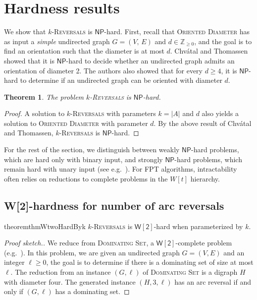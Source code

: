 \documentclass[11pt, twoside]{article}
\numberwithin{equation}{section}
\numberwithin{table}{section}
\numberwithin{figure}{section}
\newtheorem{theorem}{Theorem}[section]
\theoremstyle{definition}
\theoremstyle{definition}
\theoremstyle{definition}
\def\NP{\mathsf{NP}}
\def\W2{\mathsf{W[2]}}
\begin{document}
\section{Hardness results} \label{sec:hardness}
We show that  \textsc{$k$-Reversals} is $\NP$-hard. First, recall that \textsc{Oriented Diameter} has as input a \emph{simple} undirected graph $G=(V, \, E)$ and $d \in \mathbb{Z}_{\geq 0}$, and the goal is  to find an orientation such that the diameter is at most $d$. Chv{\'a}tal and Thomassen \cite{chvatal1978distances} showed that it is  $\NP$-hard to decide whether an undirected graph admits an orientation of diameter 2. The authors also showed that for every $d \geq 4$, it is $\NP$-hard to determine if an undirected graph can be oriented with diameter $d$.

\begin{theorem}\label{thm:hardness}
    The problem \textsc{$k$-Reversals} is $\NP$-hard.
\end{theorem}
\begin{proof}
A solution to \textsc{$k$-Reversals} with parameters $k = |A|$ and $d$ also yields a solution to \textsc{Oriented Diameter} with parameter $d$.
By the above result of Chv{\'a}tal and Thomassen, \textsc{$k$-Reversals} is $\NP$-hard.
\end{proof}

For the rest of the section, we distinguish between weakly $\NP$-hard problems, which are hard only with binary input, and strongly $\NP$-hard problems, which remain hard with unary input (see e.g.~\cite{cygan2015parameterized}). For FPT algorithms, intractability often relies on reductions to complete problems in the $W[t]$ hierarchy.
\subsection{W[2]-hardness for number of arc reversals \label{sec:W2hard_for_number_flips}}
\begin{restatable}[$\star$]{theorem}{thmWtwoHardByk}\label{thm:W2-hard_with_k}
\textsc{$k$-Reversals} is $\W2$-hard when parameterized by $k$.
\end{restatable}
\begin{proof}[Proof sketch.] 
    We reduce from \textsc{Dominating Set}, a $\W2$-complete problem (e.g.~\cite{cygan2015parameterized}). In this problem, we are given an undirected graph $G = (V,E)$ and an integer $\ell \geq 0$, the goal is to determine if there is a dominating set of size at most $\ell$. The reduction from an instance $(G,\ell)$ of \textsc{Dominating Set} is a digraph $H$ with diameter four. The generated instance $(H,3,\ell)$ has an arc reversal if and only if   $(G,\ell)$ has a dominating set.
\end{proof}
\end{document}

